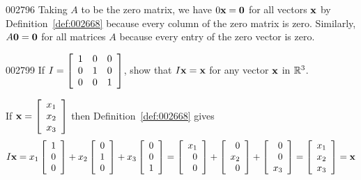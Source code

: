 \begin{example}{}{002796}
Taking $A$ to be the zero matrix, we have $0\textbf{x} = \textbf{0}$ for all vectors $\textbf{x}$ by Definition~\ref{def:002668} because every column of the zero matrix is zero. Similarly, $A\textbf{0} = \textbf{0}$ for all matrices $A$ because every entry of the zero vector is zero.
\end{example}

\begin{example}{}{002799}
If $I = \left[ \begin{array}{rrr}
1 & 0 & 0 \\
0 & 1 & 0 \\
0 & 0 & 1
\end{array} \right]$, show that $I\textbf{x} = \textbf{x}$ for any vector $\textbf{x}$ in $\mathbb{R}^3$.


\begin{solution}
  If $\textbf{x} = \left[ \begin{array}{r}
  x_{1} \\
  x_{2} \\
  x_{3}
  \end{array} \right]$
 then Definition~\ref{def:002668} gives
\begin{equation*}
I\textbf{x} = x_{1} \left[ \begin{array}{r}
1 \\
0 \\
0 \\
\end{array} \right] +
x_{2} \left[ \begin{array}{r}
0 \\
1 \\
0 \\
\end{array} \right] +
x_{3} \left[ \begin{array}{r}
0 \\
0 \\
1 \\
\end{array} \right] =
\left[ \begin{array}{r}
x_{1} \\
0 \\
0 \\
\end{array} \right] +
\left[ \begin{array}{r}
0 \\
x_{2} \\
0 \\
\end{array} \right] +
\left[ \begin{array}{r}
0 \\
0 \\
x_{3} \\
\end{array} \right] =
\left[ \begin{array}{r}
x_{1} \\
x_{2} \\
x_{3} \\
\end{array} \right] = \textbf{x}
\end{equation*}
\end{solution}
\end{example}

